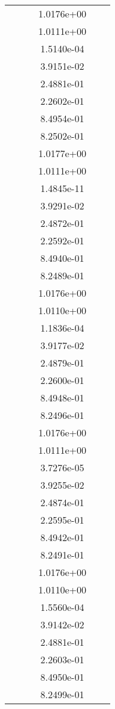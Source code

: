 \begin{xltabular}{\textwidth}{r|rS[table-format=1.3e+2]S[table-format=1.4e+2]S[table-format=1.4e+2]S[table-format=-1.5]}
&  &  & 1.0176e+00 & & \\
&  &  & 1.0111e+00 & & \\
&  &  & 1.5140e-04 & & \\
&  &  & 3.9151e-02 & & \\
&  &  & 2.4881e-01 & & \\
&  &  & 2.2602e-01 & & \\
&  &  & 8.4954e-01 & & \\
&  &  & 8.2502e-01 & & \\
&  &  & 1.0177e+00 & & \\
&  &  & 1.0111e+00 & & \\
&  &  & 1.4845e-11 & & \\
&  &  & 3.9291e-02 & & \\
&  &  & 2.4872e-01 & & \\
&  &  & 2.2592e-01 & & \\
&  &  & 8.4940e-01 & & \\
&  &  & 8.2489e-01 & & \\
&  &  & 1.0176e+00 & & \\
&  &  & 1.0110e+00 & & \\
&  &  & 1.1836e-04 & & \\
&  &  & 3.9177e-02 & & \\
&  &  & 2.4879e-01 & & \\
&  &  & 2.2600e-01 & & \\
&  &  & 8.4948e-01 & & \\
&  &  & 8.2496e-01 & & \\
&  &  & 1.0176e+00 & & \\
&  &  & 1.0111e+00 & & \\
&  &  & 3.7276e-05 & & \\
&  &  & 3.9255e-02 & & \\
&  &  & 2.4874e-01 & & \\
&  &  & 2.2595e-01 & & \\
&  &  & 8.4942e-01 & & \\
&  &  & 8.2491e-01 & & \\
&  &  & 1.0176e+00 & & \\
&  &  & 1.0110e+00 & & \\
&  &  & 1.5560e-04 & & \\
&  &  & 3.9142e-02 & & \\
&  &  & 2.4881e-01 & & \\
&  &  & 2.2603e-01 & & \\
&  &  & 8.4950e-01 & & \\
&  &  & 8.2499e-01 & & \\

\end{xltabular}
